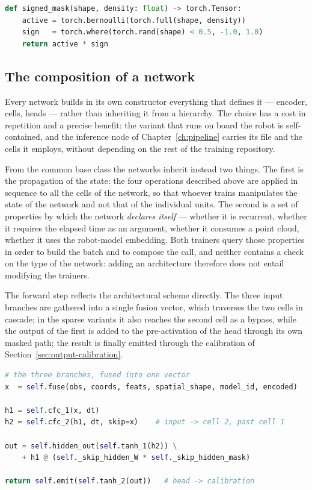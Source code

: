 \begin{lstlisting}[language=Python, caption={Generation of the signed sparse mask.}, label={lst:mask}]
def signed_mask(shape, density: float) -> torch.Tensor:
    active = torch.bernoulli(torch.full(shape, density))
    sign   = torch.where(torch.rand(shape) < 0.5, -1.0, 1.0)
    return active * sign
\end{lstlisting}

\subsection{The composition of a network}

Every network builds in its own constructor everything that defines it ---
encoder, cells, heads --- rather than inheriting it from a hierarchy. The choice
has a cost in repetition and a precise benefit: the variant that runs on board
the robot is self-contained, and the inference node of Chapter~\ref{ch:pipeline}
carries its file and the cells it employs, without depending on the rest of the
training repository.

From the common base class the networks inherit instead two things. The first is
the propagation of the state: the four operations described above are applied in
sequence to all the cells of the network, so that whoever trains manipulates the
state of the network and not that of the individual units. The second is a set
of properties by which the network \emph{declares itself} --- whether it is
recurrent, whether it requires the elapsed time as an argument, whether it
consumes a point cloud, whether it uses the robot-model embedding. Both trainers
query those properties in order to build the batch and to compose the call, and
neither contains a check on the type of the network: adding an architecture
therefore does not entail modifying the trainers.

The forward step reflects the architectural scheme directly. The three input
branches are gathered into a single fusion vector, which traverses the two cells
in cascade; in the sparse variants it also reaches the second cell as a bypass,
while the output of the first is added to the pre-activation of the head through
its own masked path; the result is finally emitted through the calibration of
Section~\ref{sec:output-calibration}.

\begin{lstlisting}[language=Python, caption={Forward step of a sparse variant, from the three sources to the command.}, label={lst:forward}]
# the three branches, fused into one vector
x  = self.fuse(obs, coords, feats, spatial_shape, model_id, encoded)

h1 = self.cfc_1(x, dt)
h2 = self.cfc_2(h1, dt, skip=x)    # input -> cell 2, past cell 1

out = self.hidden_out(self.tanh_1(h2)) \
    + h1 @ (self._skip_hidden_W * self._skip_hidden_mask)

return self.emit(self.tanh_2(out))   # head -> calibration
\end{lstlisting}

